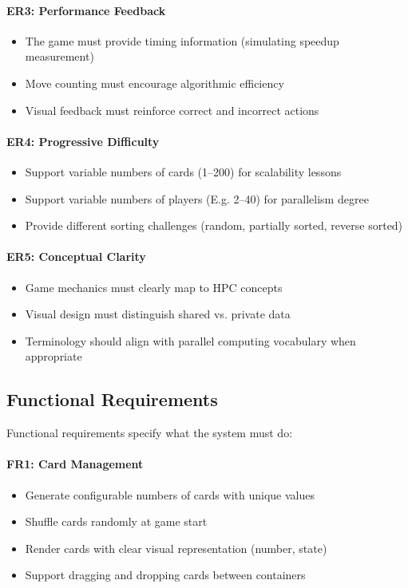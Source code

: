 \paragraph*{ER3: Performance Feedback}
\begin{itemize}
    \item The game must provide timing information (simulating speedup measurement)
    \item Move counting must encourage algorithmic efficiency
    \item Visual feedback must reinforce correct and incorrect actions
\end{itemize}

\paragraph*{ER4: Progressive Difficulty}
\begin{itemize}
    \item Support variable numbers of cards (1--200) for scalability lessons
    \item Support variable numbers of players (E.g. 2--40) for parallelism degree
    \item Provide different sorting challenges (random, partially sorted, reverse sorted)
\end{itemize}

\paragraph*{ER5: Conceptual Clarity}
\begin{itemize}
    \item Game mechanics must clearly map to HPC concepts
    \item Visual design must distinguish shared vs. private data
    \item Terminology should align with parallel computing vocabulary when appropriate
\end{itemize}

\subsection{Functional Requirements}
\label{subsec:functional-requirements}

Functional requirements specify what the system must do:

\paragraph*{FR1: Card Management}
\begin{itemize}
    \item Generate configurable numbers of cards with unique values
    \item Shuffle cards randomly at game start
    \item Render cards with clear visual representation (number, state)
    \item Support dragging and dropping cards between containers
\end{itemize}

